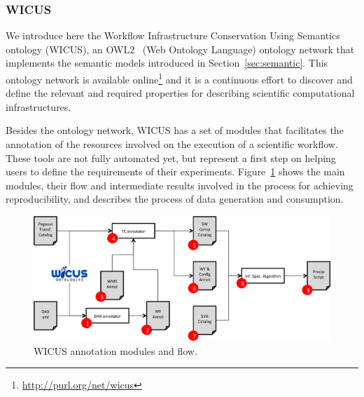 \documentclass[final,5p,times,twocolumn]{elsarticle}
\begin{document}
\subsubsection{WICUS}
We introduce here the Workflow Infrastructure Conservation Using Semantics ontology (WICUS), an OWL2~\cite{OWL2} (Web Ontology Language) ontology network that implements the semantic models introduced in Section~\ref{sec:semantic}. This ontology network is available online\footnote{\url{http://purl.org/net/wicus}} and it is a continuous effort to discover and define the relevant and required properties for describing scientific computational infrastructures. 

Besides the ontology network, WICUS has a set of modules that facilitates the annotation of the resources involved on the execution of a scientific workflow. These tools are not fully automated yet, but represent a first step on helping users to define the requirements of their experiments. Figure~\ref{fig:wicusflow} shows the main modules, their flow and intermediate results involved in the process for achieving reproducibility, and describes the process of data generation and consumption.

\begin{figure}[!htb]
	\centering
	\includegraphics[width=\linewidth]{figures/wicusflow}
	\caption{WICUS annotation modules and flow.}
	\label{fig:wicusflow}
\end{figure}
\end{document}
